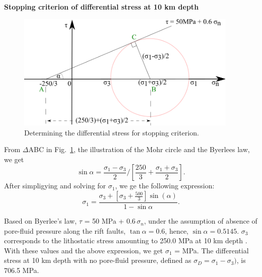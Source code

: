 \documentclass[draft,jgrga]{agutexSI2019}
\begin{document}
\begin{article}
\vspace{10mm} %

\noindent\textbf{Stopping criterion of differential stress at 10 km depth}
\vspace{10mm} %

\begin{figure}[ht]
\includegraphics[width=25pc]{Figures/Calc_diff_stress.png}
\caption{Determining the differential stress for stopping criterion.}
\label{S2}
\end{figure}

\vspace{5mm} %

From $\Delta$ABC in Fig.~\ref{S2}, the illustration of the Mohr circle and the Byerlees law, we get
\[
 \sin \alpha = \frac{\sigma_{1}-\sigma_{3}}{2} / \left[\frac{250}{3} + \frac{\sigma_{1}+\sigma_{3}}{2} \right].
\]
%
%
After simpligying and solving for $\sigma_{1}$, we ge the following expression:
\[
 \sigma_{1} = \frac{\sigma_{3}+[\sigma_{3}+\frac{500}{3}] \sin(\alpha)}{1-\sin \alpha}.
\]

Based on Byerlee's law, $\tau$  = 50 MPa + 0.6$\,\sigma_n$, under the assumption of absence of pore-fluid pressure along the rift faults, $\tan \alpha = 0.6$, hence, $\sin \alpha = 0.5145$. $\sigma_{3}$ corresponds to the lithostatic stress amounting to 250.0 MPa at 10 km depth . With these values and the above expression, we get $\sigma_{1}$ =  MPa. The differential stress at 10 km depth with no pore-fluid pressure, defined as $\sigma_{D} = \sigma_{1} - \sigma_{3})$, is 706.5 MPa. 


\end{article}
\end{document}
